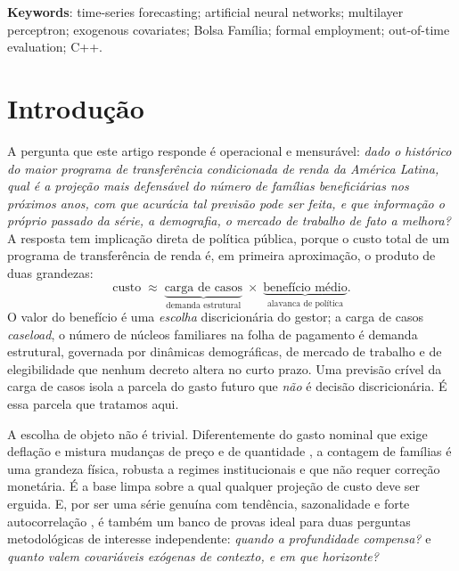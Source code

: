 \documentclass[12pt,a4paper,oneside]{article}
\begin{document}
\noindent\textbf{Keywords}: time-series forecasting; artificial neural
networks; multilayer perceptron; exogenous covariates; Bolsa Família;
formal employment; out-of-time evaluation; C++.

\newpage
\tableofcontents
\newpage

\section{Introdução}

A pergunta que este artigo responde é operacional e mensurável:
\emph{dado o histórico do maior programa de transferência condicionada de
renda da América Latina, qual é a projeção mais defensável do número de
famílias beneficiárias nos próximos anos, com que acurácia tal previsão
pode ser feita, e que informação \textemdash{} o próprio passado da série,
a demografia, o mercado de trabalho \textemdash{} de fato a melhora?} A
resposta tem implicação direta de política pública, porque o custo total
de um programa de transferência de renda é, em primeira aproximação, o
produto de duas grandezas:
\begin{equation}
\text{custo} \;\approx\; \underbrace{\text{carga de casos}}_{\text{demanda estrutural}}
\;\times\;
\underbrace{\text{benefício médio}}_{\text{alavanca de política}} .
\label{eq:custo}
\end{equation}
O valor do benefício é uma \emph{escolha} discricionária do gestor; a
carga de casos \textemdash{} \emph{caseload}, o número de núcleos
familiares na folha de pagamento \textemdash{} é demanda estrutural,
governada por dinâmicas demográficas, de mercado de trabalho e de
elegibilidade que nenhum decreto altera no curto prazo. Uma previsão
crível da carga de casos isola a parcela do gasto futuro que \emph{não} é
decisão discricionária. É essa parcela que tratamos aqui.

A escolha de objeto não é trivial. Diferentemente do gasto nominal
\textemdash{} que exige deflação e mistura mudanças de preço e de
quantidade \textemdash{}, a contagem de famílias é uma grandeza física,
robusta a regimes institucionais e que não requer correção monetária. É a
base limpa sobre a qual qualquer projeção de custo deve ser erguida. E,
por ser uma série genuína \textemdash{} com tendência, sazonalidade e
forte autocorrelação \textemdash{}, é também um banco de provas ideal para
duas perguntas metodológicas de interesse independente: \emph{quando a
profundidade compensa?} e \emph{quanto valem covariáveis exógenas de
contexto, e em que horizonte?}
\end{document}
